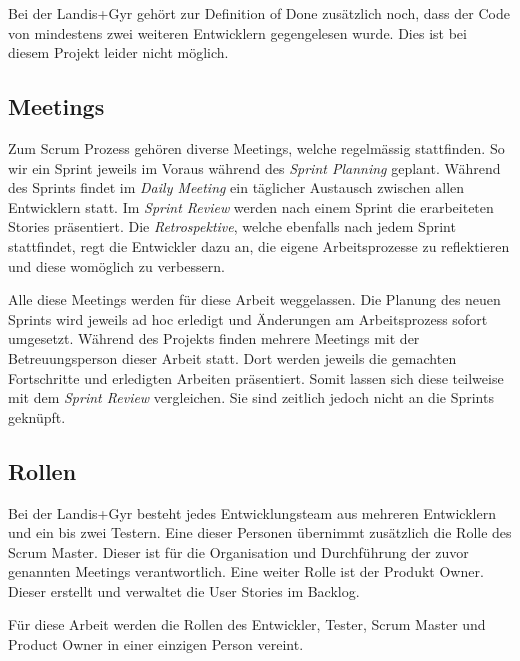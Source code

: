 Bei der Landis+Gyr gehört zur Definition of Done zusätzlich noch, dass der Code von mindestens zwei weiteren Entwicklern gegengelesen wurde.
Dies ist bei diesem Projekt leider nicht möglich.


\subsection{Meetings}
Zum Scrum Prozess gehören diverse Meetings, welche regelmässig stattfinden.
So wir ein Sprint jeweils im Voraus während des \textit{Sprint Planning} geplant.
Während des Sprints findet im \textit{Daily Meeting} ein täglicher Austausch zwischen allen Entwicklern statt.
Im \textit{Sprint Review} werden nach einem Sprint die erarbeiteten Stories präsentiert.
Die \textit{Retrospektive}, welche ebenfalls nach jedem Sprint stattfindet, regt die Entwickler dazu an, die eigene Arbeitsprozesse zu reflektieren und diese womöglich zu verbessern.

Alle diese Meetings werden für diese Arbeit weggelassen.
Die Planung des neuen Sprints wird jeweils ad hoc erledigt und Änderungen am Arbeitsprozess sofort umgesetzt.
Während des Projekts finden mehrere Meetings mit der Betreuungsperson dieser Arbeit statt.
Dort werden jeweils die gemachten Fortschritte und erledigten Arbeiten präsentiert.
Somit lassen sich diese teilweise mit dem \textit{Sprint Review} vergleichen.
Sie sind zeitlich jedoch nicht an die Sprints geknüpft.

\subsection{Rollen}
Bei der Landis+Gyr besteht jedes Entwicklungsteam aus mehreren Entwicklern und ein bis zwei Testern.
Eine dieser Personen übernimmt zusätzlich die Rolle des Scrum Master.
Dieser ist für die Organisation und Durchführung der zuvor genannten Meetings verantwortlich.
Eine weiter Rolle ist der Produkt Owner.
Dieser erstellt und verwaltet die User Stories im Backlog.

Für diese Arbeit werden die Rollen des Entwickler, Tester, Scrum Master und Product Owner in einer einzigen Person vereint.


